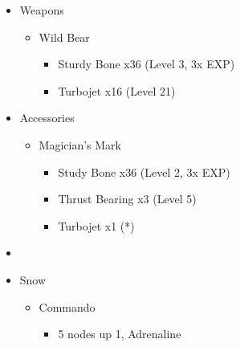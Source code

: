 \begin{paracol}{2}
\begin{upgrade}
\begin{itemize}
			      \begin{itemize}
				      \item Weapons
				            \begin{itemize}
					            \item Wild Bear
					                  \begin{itemize}
						                  \item Sturdy Bone x36 (Level 3, 3x EXP)
						                  \item Turbojet x16 (Level 21)
					                  \end{itemize}
				            \end{itemize}
				      \item Accessories
				            \begin{itemize}
					            \item Magician's Mark
					                  \begin{itemize}
						                  \item Study Bone x36 (Level 2, 3x EXP)
						                  \item Thrust Bearing x3 (Level 5)
						                  \item Turbojet x1 (*)
					                  \end{itemize}
				            \end{itemize}
			      \end{itemize}
		\end{itemize}
	\end{upgrade}
	\switchcolumn*
	\begin{menu}
		\begin{itemize}
			\paradigm
			\begin{itemize}
				\item {}%
				      {\paradigmline[1]{\textit{\com}}{\textit{\rav}}{}}%
				      {\paradigmline{\com}{\med}{}}%
				      {\paradigmline{\sen}{\med}{}}%
				      {\paradigmline{\sen}{\syn}{}}%
				      {\paradigmline{[\rav]}{\rav}{}}%
				      {\paradigmline{[\rav]}{\rav}{}}
			\end{itemize}
			\crystarium
			\begin{itemize}
				\item Snow
				      \begin{itemize}
					      \item Commando
					            \begin{itemize}
						            \item 5 nodes up 1, Adrenaline

\end{itemize}
\end{itemize}
\end{itemize}
\end{itemize}
\end{menu}
\end{paracol}
